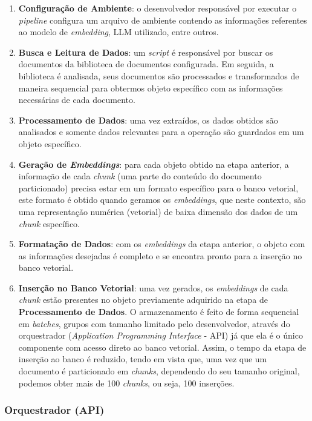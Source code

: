 \documentclass[a4paper, 12pt]{article}
\begin{document}
    \begin{enumerate}
        \item \textbf{Configuração de Ambiente}: o desenvolvedor responsável por executar o \textit{pipeline} configura um arquivo de ambiente contendo as informações referentes ao modelo de \textit{embedding}, LLM utilizado, entre outros.
        \item \textbf{Busca e Leitura de Dados}: um \textit{script} é responsável por buscar os documentos da biblioteca de documentos configurada. Em seguida, a biblioteca é analisada, seus documentos são processados e transformados de maneira sequencial para obtermos objeto específico com as informações necessárias de cada documento.
        \item \textbf{Processamento de Dados}: uma vez extraídos, os dados obtidos são analisados e somente dados relevantes para a operação são guardados em um objeto específico.
        \item \textbf{Geração de \textit{Embeddings}}: para cada objeto obtido na etapa anterior, a informação de cada \textit{chunk} (uma parte do conteúdo do documento particionado) precisa estar em um formato específico para o banco vetorial, este formato é obtido quando geramos os \textit{embeddings}, que neste contexto, são uma representação numérica (vetorial) de baixa dimensão dos dados de um \textit{chunk} específico.
        \item \textbf{Formatação de Dados}: com os \textit{embeddings} da etapa anterior, o objeto com as informações desejadas é completo e se encontra pronto para a inserção no banco vetorial.
        \item \textbf{Inserção no Banco Vetorial}: uma vez gerados, os \textit{embeddings} de cada \textit{chunk} estão presentes no objeto previamente adquirido na etapa de \textbf{Processamento de Dados}. O armazenamento é feito de forma sequencial em \textit{batches}, grupos com tamanho limitado pelo desenvolvedor, através do orquestrador (\textit{Application Programming Interface} - API) já que ela é o único componente com acesso direto ao banco vetorial. Assim, o tempo da etapa de inserção ao banco é reduzido, tendo em vista que, uma vez que um documento é particionado em \textit{chunks}, dependendo do seu tamanho original, podemos obter mais de 100 \textit{chunks}, ou seja, 100 inserções.
    \end{enumerate}
    
    \subsubsection{Orquestrador (API)} \label{sec:api_concept}
\end{document}
